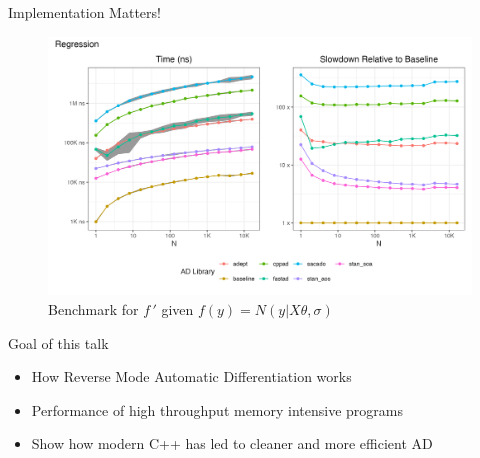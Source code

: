 \documentclass[dvipsnames]{beamer}
\begin{document}
\begin{frame}{Implementation Matters!}
\begin{figure}
\centerline{\includegraphics[scale=.5]{img/mac_regression_plot.png}}
\caption{Benchmark for $f\,'$ given $f(y) = N(y | X\theta,\sigma)$}
\label{fig-mac-red-bench}
\end{figure}
\end{frame}

\begin{frame}{Goal of this talk}
\begin{itemize}
    \item How Reverse Mode Automatic Differentiation works
    \item Performance of high throughput memory intensive programs
    \item Show how modern C++ has led to cleaner and more efficient AD
\end{itemize}
\end{frame}
\end{document}
